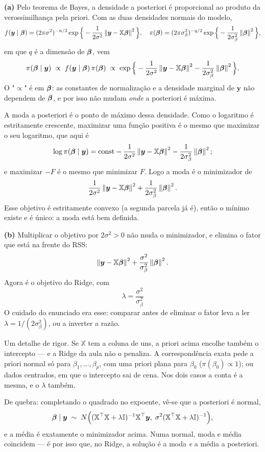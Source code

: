 \begin{solucao}
\textbf{(a)} Pelo teorema de Bayes, a densidade a posteriori é proporcional ao produto
da verossimilhança pela priori. Com as duas densidades normais do modelo,
\[
  f(\bm y\mid\bm{\beta})=(2\pi\sigma^2)^{-n/2}
    \exp\Big\{-\frac{1}{2\sigma^2}\left\lVert \bm y-\mathbb{X}\bm{\beta} \right\rVert^2\Big\},
  \quad
  \pi(\bm{\beta})=(2\pi\sigma_\beta^2)^{-q/2}
    \exp\Big\{-\frac{1}{2\sigma_\beta^2}\left\lVert \bm{\beta} \right\rVert^2\Big\},
\]
em que $q$ é a dimensão de $\bm{\beta}$, vem
\[
  \pi(\bm{\beta}\mid\bm y)\;\propto\;f(\bm y\mid\bm{\beta})\,\pi(\bm{\beta})
  \;\propto\;
  \exp\Big\{-\frac{1}{2\sigma^2}\left\lVert \bm y-\mathbb{X}\bm{\beta} \right\rVert^2
            -\frac{1}{2\sigma_\beta^2}\left\lVert \bm{\beta} \right\rVert^2\Big\}.
\]
O "$\propto$" é em $\bm{\beta}$: as constantes de normalização e a densidade marginal de
$\bm y$ não dependem de $\bm{\beta}$, e por isso não mudam \emph{onde} a posteriori é
máxima.

A moda a posteriori é o ponto de máximo dessa densidade. Como o logaritmo é
estritamente crescente, maximizar uma função positiva é o mesmo que maximizar o seu
logaritmo, que aqui é
\[
  \log\pi(\bm{\beta}\mid\bm y)=\text{const}
   -\frac{1}{2\sigma^2}\left\lVert \bm y-\mathbb{X}\bm{\beta} \right\rVert^2
   -\frac{1}{2\sigma_\beta^2}\left\lVert \bm{\beta} \right\rVert^2 ;
\]
e maximizar $-F$ é o mesmo que minimizar $F$. Logo a moda é o minimizador de
\[
  \frac{1}{2\sigma^2}\left\lVert \bm y-\mathbb{X}\bm{\beta} \right\rVert^2
  +\frac{1}{2\sigma_\beta^2}\left\lVert \bm{\beta} \right\rVert^2 .
\]
Esse objetivo é estritamente convexo (a segunda parcela já é), então o mínimo existe e
é único: a moda está bem definida.

\smallskip
\textbf{(b)} Multiplicar o objetivo por $2\sigma^2>0$ não muda o minimizador, e
elimina o fator que está na frente do RSS:
\[
  \left\lVert \bm y-\mathbb{X}\bm{\beta} \right\rVert^2+\frac{\sigma^2}{\sigma_\beta^2}\left\lVert \bm{\beta} \right\rVert^2 .
\]
Agora é o objetivo do Ridge, com
\[
  \boxed{\;\lambda=\frac{\sigma^2}{\sigma_\beta^2}\;}
\]
O cuidado do enunciado era esse: comparar antes de eliminar o fator leva a ler
$\lambda=1/(2\sigma_\beta^2)$, ou a inverter a razão.

Um detalhe de rigor. Se $\mathbb{X}$ tem a coluna de uns, a priori acima encolhe
também o intercepto --- e a Ridge da aula não o penaliza. A correspondência exata pede
a priori normal só para $\beta_1,\dots,\beta_p$, com uma priori plana para $\beta_0$
($\pi(\beta_0)\propto1$); ou dados centrados, em que o intercepto sai de cena. Nos dois
casos a conta é a mesma, e o $\lambda$ também.

De quebra: completando o quadrado no expoente, vê-se que a posteriori é normal,
\[
  \bm{\beta}\mid\bm y\;\sim\;N\Big((\mathbb{X}^\top\mathbb{X}+\lambda\mathbb{I})^{-1}\mathbb{X}^\top\bm y,\;
    \sigma^2(\mathbb{X}^\top\mathbb{X}+\lambda\mathbb{I})^{-1}\Big),
\]
e a média é exatamente o minimizador acima. Numa normal, moda e média coincidem --- é
por isso que, no Ridge, a solução é a moda \emph{e} a média a posteriori.


\end{solucao}

